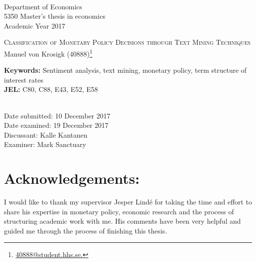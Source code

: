 	\singlespacing
	\\
	Department of Economics\\
	5350 Master’s thesis in economics\\
	Academic Year 2017\\

	\vspace{1cm}	
	\begin{centering}
		\Large{\textsc{Classification of Monetary Policy Decisions through Text Mining Techniques}}\\
		\vspace{.5cm}	
		\large{Manuel von Krosigk (40888)}\footnote{\href{mailto:40888@student.hhs.se}{40888@student.hhs.se.}}\\
	\end{centering}	
	\begin{abstract}
		
	\end{abstract}
	\textbf{Keywords:} Sentiment analysis, text mining, monetary policy, term structure of interest rates
	\\\textbf{JEL:} C80, C88, E43, E52, E58 %

	\vspace{.5cm}		
	\vfill
	\\Date submitted: 10 December 2017
	\\Date examined: 19 December 2017
	\\Discussant: Kalle Kantanen	
	\\Examiner: Mark Sanctuary


\newpage
\section*{Acknowledgements:}
I would like to thank my supervisor Jesper Lindé for taking the time and effort to share his expertise in monetary policy, economic research and the process of structuring academic work with me. His comments have been very helpful and guided me through the process of finishing this thesis. 

